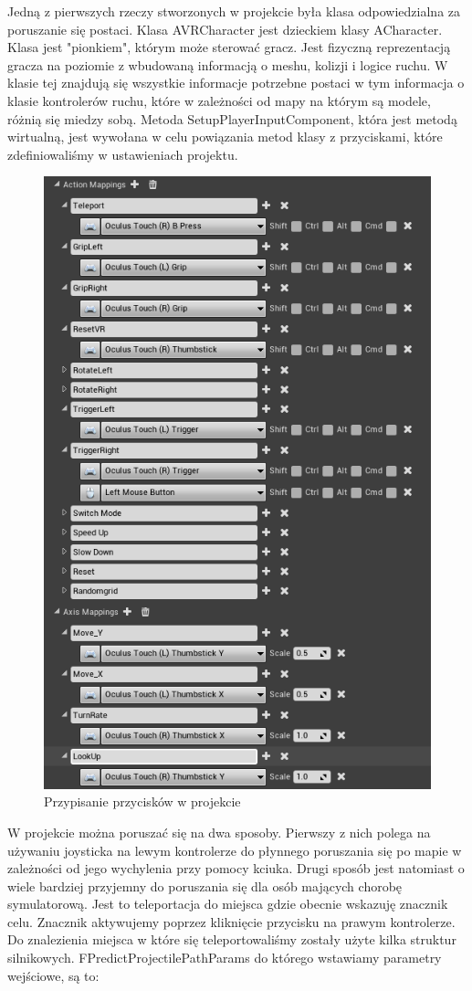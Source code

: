 \documentclass[a4paper,12pt,reqno]{article}
\begin{document}
Jedną z pierwszych rzeczy stworzonych w projekcie była klasa odpowiedzialna za poruszanie się postaci. Klasa AVRCharacter jest dzieckiem klasy ACharacter. Klasa jest "pionkiem", którym może sterować gracz. Jest fizyczną reprezentacją gracza na poziomie z wbudowaną informacją o meshu, kolizji i logice ruchu. W klasie tej znajdują się wszystkie informacje potrzebne postaci w tym informacja o klasie kontrolerów ruchu, które w zależności od mapy na którym są modele, różnią się miedzy sobą. Metoda SetupPlayerInputComponent, która jest metodą wirtualną, jest wywołana w celu powiązania metod klasy z przyciskami, które zdefiniowaliśmy w ustawieniach projektu. 




\begin{figure}[H]%
\centering
\includegraphics[width=0.4\linewidth]{graphics/05/InputMappingUE4.png}
\caption{Przypisanie przycisków w projekcie }	
\label{ref:InputMappingUE4}
\end{figure}%

W projekcie można poruszać się na dwa sposoby. Pierwszy z nich polega na używaniu 
joysticka na lewym kontrolerze do płynnego poruszania się po mapie w zależności od jego wychylenia przy pomocy kciuka. Drugi sposób jest natomiast o wiele bardziej przyjemny do poruszania się dla osób mających chorobę symulatorową. Jest to teleportacja do miejsca gdzie obecnie wskazuję znacznik celu. Znacznik aktywujemy poprzez kliknięcie przycisku na prawym kontrolerze. Do znalezienia miejsca w które się teleportowaliśmy zostały użyte kilka struktur silnikowych. FPredictProjectilePathParams do którego wstawiamy parametry wejściowe, są to:
\end{document}
